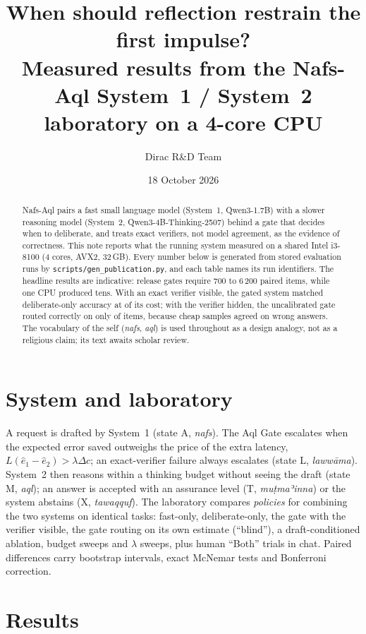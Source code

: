 \documentclass[11pt]{article}
\title{When should reflection restrain the first impulse?\\[2pt]\large Measured results from the Nafs-Aql System~1 / System~2 laboratory on a 4-core CPU}
\author{Dirac R\&D Team}
\date{18 October 2026}
\begin{document}
\maketitle
\begin{abstract}
Nafs-Aql pairs a fast small language model (System~1, Qwen3-1.7B) with a slower reasoning model (System~2, Qwen3-4B-Thinking-2507) behind a gate that decides when to deliberate, and treats exact verifiers, not model agreement, as the evidence of correctness. This note reports what the running system measured on a shared Intel i3-8100 (4 cores, AVX2, 32\,GB). Every number below is generated from stored evaluation runs by \texttt{scripts/gen\_publication.py}, and each table names its run identifiers. The headline results are indicative: release gates require 700 to 6\,200 paired items, while one CPU produced tens. With an exact verifier visible, the gated system matched deliberate-only accuracy at \GatedCostRatio{} of its cost; with the verifier hidden, the uncalibrated gate routed correctly on only \BlindRouting{} of items, because cheap samples agreed on wrong answers. The vocabulary of the self (\emph{nafs}, \emph{\textquotesingle aql}) is used throughout as a design analogy, not as a religious claim; its text awaits scholar review.
\end{abstract}

\section{System and laboratory}
A request is drafted by System~1 (state A, \emph{nafs}). The Aql Gate escalates when the expected error saved outweighs the price of the extra latency, $L(\hat e_1-\hat e_2)>\lambda\Delta c$; an exact-verifier failure always escalates (state L, \emph{lawwāma}). System~2 then reasons within a thinking budget without seeing the draft (state M, \emph{\textquotesingle aql}); an answer is accepted with an assurance level (T, \emph{muṭmaʾinna}) or the system abstains (X, \emph{tawaqquf}). The laboratory compares \emph{policies} for combining the two systems on identical tasks: fast-only, deliberate-only, the gate with the verifier visible, the gate routing on its own estimate (``blind''), a draft-conditioned ablation, budget sweeps and $\lambda$ sweeps, plus human ``Both'' trials in chat. Paired differences carry bootstrap intervals, exact McNemar tests and Bonferroni correction.

\section{Results}
\end{document}
